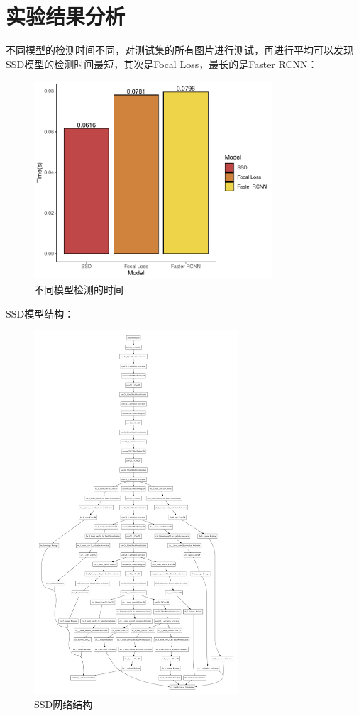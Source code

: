 \documentclass[journal,transmag]{IEEEtran}
\begin{document}
\section{实验结果分析}
不同模型的检测时间不同，对测试集的所有图片进行测试，再进行平均可以发现SSD模型的检测时间最短，其次是Focal Loss，最长的是Faster RCNN：
\begin{figure}[h]
\centering
\includegraphics[width=3.5in]{time.pdf}
\caption{不同模型检测的时间}
\end{figure}

SSD模型结构：
\begin{figure}[h]
\centering
\includegraphics[width=3in]{modelgraph.pdf}
\caption{SSD网络结构}
\end{figure}
\end{document}

